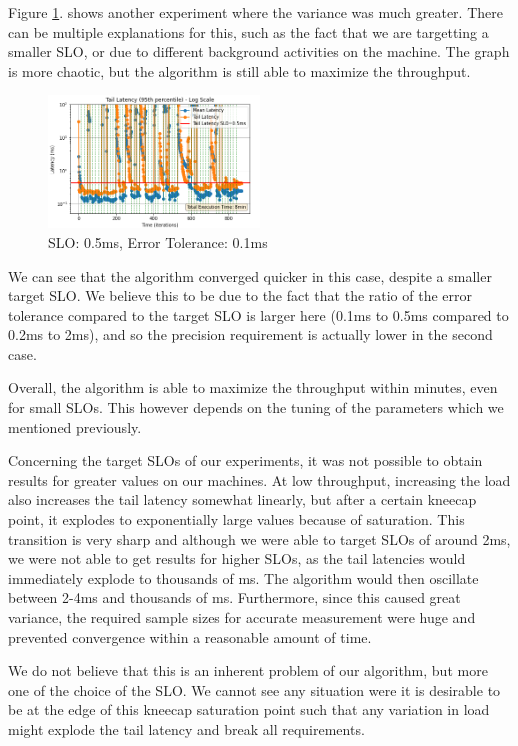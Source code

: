 \documentclass[10pt,conference,compsocconf]{IEEEtran}
\begin{document}
Figure \ref{fig:res2}. shows another experiment where the variance was much greater. There can be multiple explanations for this, such as the fact that we are targetting a smaller SLO, or due to different background activities on the machine. The graph is more chaotic, but the algorithm is still able to maximize the throughput.

\begin{figure}[H]
	\centering
	\includegraphics[width=0.5\textwidth]{result2.png}
	\vspace{-1em}
	\caption{SLO: 0.5ms, Error Tolerance: 0.1ms}
	\label{fig:res2}
\end{figure}

We can see that the algorithm converged quicker in this case, despite a smaller target SLO. We believe this to be due to the fact that the ratio of the error tolerance compared to the target SLO is larger here (0.1ms to 0.5ms compared to 0.2ms to 2ms), and so the precision requirement is actually lower in the second case.

Overall, the algorithm is able to maximize the throughput within minutes, even for small SLOs. This however depends on the tuning of the parameters which we mentioned previously. 

Concerning the target SLOs of our experiments, it was not possible to obtain results for greater values on our machines. At low throughput, increasing the load also increases the tail latency somewhat linearly, but after a certain kneecap point, it explodes to exponentially large values because of saturation. This transition is very sharp and although we were able to target SLOs of around 2ms, we were not able to get results for higher SLOs, as the tail latencies would immediately explode to thousands of ms. The algorithm would then oscillate between 2-4ms and thousands of ms. Furthermore, since this caused great variance, the required sample sizes for accurate measurement were huge and prevented convergence within a reasonable amount of time. 

We do not believe that this is an inherent problem of our algorithm, but more one of the choice of the SLO. We cannot see any situation were it is desirable to be at the edge of this kneecap saturation point such that any variation in load might explode the tail latency and break all requirements.
\end{document}
